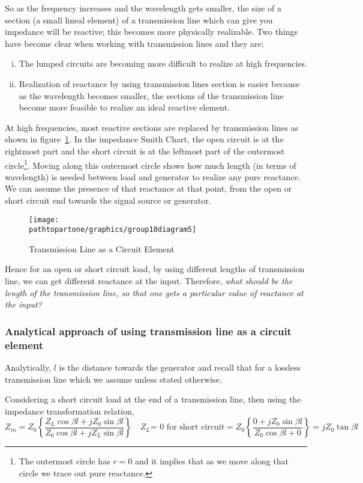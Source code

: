 So as the frequency increases and the wavelength gets smaller, the size of a section (a small lineal element) of a transmission line which can give you impedance will be reactive; this becomes more physically realizable. Two things have become clear when working with transmission
lines and they are;
\begin{enumerate}[(i)]
\item The lumped circuits are becoming more difficult to realize at high frequencies.
\item Realization of reactance by using transmission lines section is easier because as the wavelength becomes smaller, the sections of the transmission line become more feasible to realize an ideal reactive element.
\end{enumerate}
At high frequencies, most reactive sections are replaced by transmission lines as shown in figure~\ref{fig:group10diagram5}. In the impedance Smith Chart, the open circuit is at the rightmost part and the short circuit is at the leftmost part of the outermost circle\footnote{
The outermost circle has $r = 0$ and it implies that as we move along that circle we trace out pure reactance.
}. Moving along this outermost circle shows how much length (in terms of wavelength) is needed between load and generator to realize any pure reactance. We can assume the presence of that reactance at that point, from the open or short circuit end towards the signal source or generator.
\begin{figure}[h]
\centering
\texttt{[image: \\pathtopartone/graphics/group10diagram5]}
\caption{Transmission Line as a Circuit Element}
\label{fig:group10diagram5}
\end{figure}

Hence for an open or short circuit load, by using different lengths of transmission line, we can get different reactance at the input. Therefore, \emph{what should be the length of the transmission line, so that one gets a particular value of reactance at the input?}

\subsubsection{Analytical approach of using transmission line as a circuit element}
Analytically, $l$ is the distance towards the generator and recall that for a lossless transmission line which we assume unless stated otherwise.

Considering a short circuit load at the end of a transmission line, then using the impedance transformation relation,
\begin{dmath}
Z_{in} = Z_0 \left\lbrace\frac{Z_{L}\cos\beta l + jZ_0\sin\beta l}{Z_0\cos\beta l + jZ_{L}\sin\beta l}\right\rbrace\quad Z_{L} \text{= 0 for short circuit} 
= Z_0 \left\lbrace \frac{0 + jZ_0\sin\beta l}{Z_0\cos\beta l + 0}\right\rbrace = jZ_0\tan\beta l
\label{eqn:zinshortcircuit}
\end{dmath}

